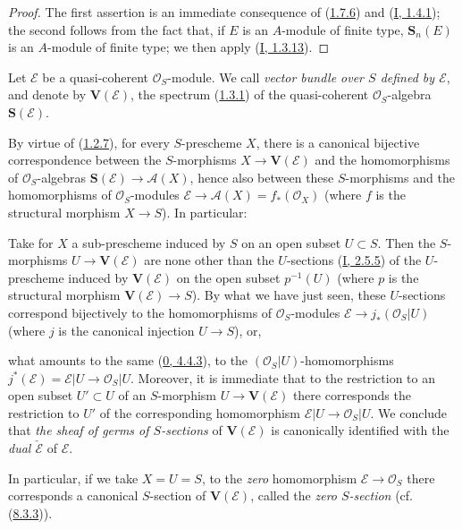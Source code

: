 \begin{proof}
The first assertion is an immediate consequence of
(\hyperref[II.1.7.6]{1.7.6}) and
(\hyperref[I.1.4.1]{I, 1.4.1}); the second follows from the fact that,
if $E$ is an $A$-module of finite type, $\mathbf{S}_n(E)$ is an $A$-module
of finite type; we then apply (\hyperref[I.1.3.13]{I, 1.3.13}).
\end{proof}

\begin{definition}[1.7.8]
\label{II.1.7.8}
Let $\mathcal{E}$ be a quasi-coherent $\mathcal{O}_S$-module. We call
\emph{vector bundle over $S$ defined by $\mathcal{E}$}, and denote by
$\mathbf{V}(\mathcal{E})$, the spectrum
(\hyperref[II.1.3.1]{1.3.1}) of the quasi-coherent $\mathcal{O}_S$-algebra
$\mathbf{S}(\mathcal{E})$.
\end{definition}

By virtue of (\hyperref[II.1.2.7]{1.2.7}), for every $S$-prescheme $X$,
there is a canonical bijective correspondence between the $S$-morphisms
$X\to\mathbf{V}(\mathcal{E})$ and the homomorphisms of
$\mathcal{O}_S$-algebras $\mathbf{S}(\mathcal{E})\to\mathcal{A}(X)$, hence
also between these $S$-morphisms and the homomorphisms of
$\mathcal{O}_S$-modules
$\mathcal{E}\to\mathcal{A}(X)=f_*(\mathcal{O}_X)$ (where $f$ is the
structural morphism $X\to S$). In particular:

\begin{env}[1.7.9]
\label{II.1.7.9}
Take for $X$ a sub-prescheme induced by $S$ on an open subset
$U\subset S$. Then the $S$-morphisms $U\to\mathbf{V}(\mathcal{E})$ are none
other than the $U$-sections (\hyperref[I.2.5.5]{I, 2.5.5}) of the
$U$-prescheme induced by $\mathbf{V}(\mathcal{E})$ on the open subset
$p^{-1}(U)$ (where $p$ is the structural morphism
$\mathbf{V}(\mathcal{E})\to S$). By what we have just seen, these
$U$-sections correspond bijectively to the homomorphisms of
$\mathcal{O}_S$-modules
$\mathcal{E}\to j_*(\mathcal{O}_S|U)$ (where $j$ is the canonical injection
$U\to S$), or,

what amounts to the same (\hyperref[0.4.4.3]{0, 4.4.3}), to the
$(\mathcal{O}_S|U)$-homomorphisms
$j^*(\mathcal{E})=\mathcal{E}|U\to\mathcal{O}_S|U$. Moreover, it is
immediate that to the restriction to an open subset $U'\subset U$ of an
$S$-morphism $U\to\mathbf{V}(\mathcal{E})$ there corresponds the
restriction to $U'$ of the corresponding homomorphism
$\mathcal{E}|U\to\mathcal{O}_S|U$. We conclude that \emph{the sheaf of
germs of $S$-sections} of $\mathbf{V}(\mathcal{E})$ is canonically
identified with the \emph{dual $\check{\mathcal{E}}$} of $\mathcal{E}$.

In particular, if we take $X=U=S$, to the \emph{zero} homomorphism
$\mathcal{E}\to\mathcal{O}_S$ there corresponds a canonical $S$-section of
$\mathbf{V}(\mathcal{E})$, called the \emph{zero $S$-section}
(cf. (\hyperref[II.8.3.3]{8.3.3})).
\end{env}

